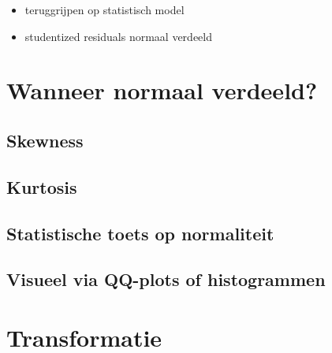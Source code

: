 \documentclass[]{book}
\providecommand{\tightlist}{%
  \setlength{\itemsep}{0pt}\setlength{\parskip}{0pt}}
\theoremstyle{definition}
\theoremstyle{definition}
\theoremstyle{definition}
\theoremstyle{remark}
\begin{document}
\begin{itemize}
\tightlist
\item
  teruggrijpen op statistisch model
\item
  studentized residuals normaal verdeeld
\end{itemize}

\section{Wanneer normaal verdeeld?}\label{wanneer-normaal-verdeeld}

\subsection{Skewness}\label{skewness}

\subsection{Kurtosis}\label{kurtosis}

\subsection{Statistische toets op
normaliteit}\label{statistische-toets-op-normaliteit}

\subsection{Visueel via QQ-plots of
histogrammen}\label{visueel-via-qq-plots-of-histogrammen}

\section{Transformatie}\label{transformatie}
\end{document}
